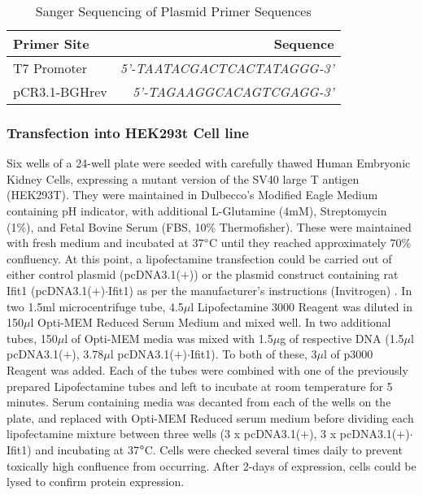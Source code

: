 \begin{table}[!htbp]
\footnotesize
\centering
\begin{tabular}{lr}
Primer Site & Sequence \\
\hline
\small{T7 Promoter} & {\textit{5’-TAATACGACTCACTATAGGG-3’}} \\
\small{pCR3.1-BGHrev} & {\textit{5’-TAGAAGGCACAGTCGAGG-3’}} \\
\end{tabular}
\caption{Sanger Sequencing of Plasmid Primer Sequences}
\label{tab:SangerPrimerSequences}	
\end{table}

\subsubsection{Transfection into HEK293t Cell line}

Six wells of a 24-well plate were seeded with carefully thawed Human Embryonic Kidney Cells, expressing a mutant version of the SV40 large T antigen (HEK293T). They were maintained in Dulbecco's Modified Eagle Medium containing pH indicator, with additional L-Glutamine (4mM), Streptomycin (1\%), and Fetal Bovine Serum (FBS, 10\% Thermofisher). These were maintained with fresh medium and incubated at 37$\degree$C until they reached approximately 70\% confluency. At this point, a lipofectamine transfection could be carried out of either control plasmid (pcDNA3.1($+$)) or the plasmid construct containing rat Ifit1 (pcDNA3.1($+$)$\cdot$Ifit1) as per the manufacturer's instructions (Invitrogen) \cite{Invitrogen}. In two 1.5ml microcentrifuge tube, 4.5$\mu$l Lipofectamine 3000 Reagent was diluted in 150$\mu$l Opti-MEM Reduced Serum Medium and mixed well. In two additional tubes, 150$\mu$l of Opti-MEM media was mixed with 1.5$\mu$g of respective DNA (1.5$\mu$l pcDNA3.1($+$), 3.78$\mu$l pcDNA3.1($+$)$\cdot$Ifit1). To both of these, 3$\mu$l of p3000 Reagent was added. Each of the tubes were combined with one of the previously prepared Lipofectamine tubes and left to incubate at room temperature for 5 minutes. Serum containing media was decanted from each of the wells on the plate, and replaced with Opti-MEM Reduced serum medium before dividing each lipofectamine mixture between three wells (3 x pcDNA3.1($+$), 3 x pcDNA3.1($+$)$\cdot$Ifit1) and incubating at 37$\degree$C. Cells were checked several times daily to prevent toxically high confluence from occurring. After 2-days of expression, cells could be lysed to confirm protein expression.

